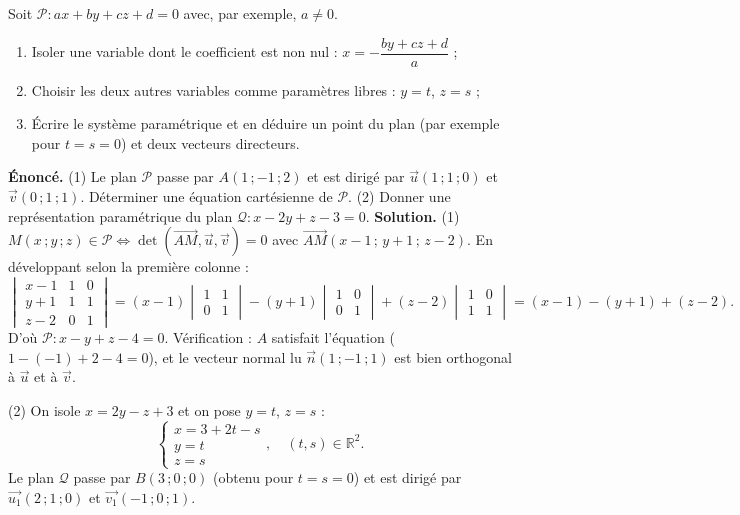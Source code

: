 \documentclass[11pt]{article}
\begin{document}
\begin{methode}
Soit $\mathcal{P} : ax + by + cz + d = 0$ avec, par exemple, $a \neq 0$.
\begin{enumerate}
\item Isoler une variable dont le coefficient est non nul : $x = -\dfrac{by + cz + d}{a}$ ;
\item Choisir les deux autres variables comme paramètres libres : $y = t$, $z = s$ ;
\item Écrire le système paramétrique et en déduire un point du plan (par exemple pour $t = s = 0$) et deux vecteurs directeurs.
\end{enumerate}
\end{methode}

\begin{exoresolu}
\textbf{Énoncé.} (1) Le plan $\mathcal{P}$ passe par $A(1\,;-1\,;2)$ et est dirigé par $\vec{u}(1\,;1\,;0)$ et $\vec{v}(0\,;1\,;1)$. Déterminer une équation cartésienne de $\mathcal{P}$. (2) Donner une représentation paramétrique du plan $\mathcal{Q} : x - 2y + z - 3 = 0$.
\tcblower
\textbf{Solution.} (1) $M(x\,;y\,;z) \in \mathcal{P} \iff \det(\overrightarrow{AM}, \vec{u}, \vec{v}) = 0$ avec $\overrightarrow{AM}(x-1\,;\,y+1\,;\,z-2)$. En développant selon la première colonne :
\[
\begin{vmatrix} x-1 & 1 & 0 \\ y+1 & 1 & 1 \\ z-2 & 0 & 1 \end{vmatrix}
= (x-1)\begin{vmatrix} 1 & 1 \\ 0 & 1 \end{vmatrix} - (y+1)\begin{vmatrix} 1 & 0 \\ 0 & 1 \end{vmatrix} + (z-2)\begin{vmatrix} 1 & 0 \\ 1 & 1 \end{vmatrix}
= (x-1) - (y+1) + (z-2).
\]
D'où $\mathcal{P} : x - y + z - 4 = 0$. Vérification : $A$ satisfait l'équation ($1 - (-1) + 2 - 4 = 0$), et le vecteur normal lu $\vec{n}(1\,;-1\,;1)$ est bien orthogonal à $\vec{u}$ et à $\vec{v}$.

(2) On isole $x = 2y - z + 3$ et on pose $y = t$, $z = s$ :
\[
\begin{cases} x = 3 + 2t - s \\ y = t \\ z = s \end{cases}, \quad (t,s) \in \mathbb{R}^2.
\]
Le plan $\mathcal{Q}$ passe par $B(3\,;0\,;0)$ (obtenu pour $t = s = 0$) et est dirigé par $\vec{u_1}(2\,;1\,;0)$ et $\vec{v_1}(-1\,;0\,;1)$.
\end{exoresolu}
\end{document}
